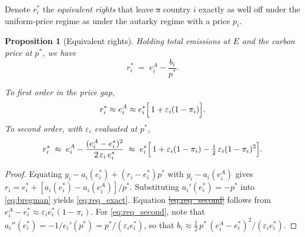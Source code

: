 \documentclass[12pt,english]{article}
\newtheorem{proposition}{Proposition}
\theoremstyle{remark}
\providecommand{\DIFaddtex}[1]{{\protect\color{blue}\uwave{#1}}} %
\providecommand{\DIFdeltex}[1]{{\protect\color{red}\sout{#1}}}                      %
\providecommand{\DIFaddbegin}{} %
\providecommand{\DIFaddend}{} %
\providecommand{\DIFdelbegin}{} %
\providecommand{\DIFdelend}{} %
\providecommand{\DIFadd}[1]{\texorpdfstring{\DIFaddtex{#1}}{#1}} %
\providecommand{\DIFdel}[1]{\texorpdfstring{\DIFdeltex{#1}}{}} %
\newcommand{\DIFscaledelfig}{0.5}
\newlength{\DIFdelgraphicswidth} %
\newlength{\DIFdelgraphicsheight} %
\newcommand{\DIFaddincludegraphics}[2][]{{\color{blue}\fbox{\DIFOincludegraphics[#1]{#2}}}} %
\newcommand{\DIFdelincludegraphics}[2][]{%
\sbox{\DIFdelgraphicsbox}{\DIFOincludegraphics[#1]{#2}}%
\settoboxwidth{\DIFdelgraphicswidth}{\DIFdelgraphicsbox} %
\settoboxtotalheight{\DIFdelgraphicsheight}{\DIFdelgraphicsbox} %
\scalebox{\DIFscaledelfig}{%
\parbox[b]{\DIFdelgraphicswidth}{\usebox{\DIFdelgraphicsbox}\\[-\baselineskip] \rule{\DIFdelgraphicswidth}{0em}}\llap{\resizebox{\DIFdelgraphicswidth}{\DIFdelgraphicsheight}{%
\setlength{\unitlength}{\DIFdelgraphicswidth}%
\begin{picture}(1,1)%
\thicklines\linethickness{2pt} %
{\color[rgb]{1,0,0}\put(0,0){\framebox(1,1){}}}%
{\color[rgb]{1,0,0}\put(0,0){\line( 1,1){1}}}%
{\color[rgb]{1,0,0}\put(0,1){\line(1,-1){1}}}%
\end{picture}%
}\hspace*{3pt}}} %
} %
\DeclareRobustCommand{\DIFaddbegin}{\DIFOaddbegin \let\includegraphics\DIFaddincludegraphics} %
\DeclareRobustCommand{\DIFaddend}{\DIFOaddend \let\includegraphics\DIFOincludegraphics} %
\DeclareRobustCommand{\DIFdelbegin}{\DIFOdelbegin \let\includegraphics\DIFdelincludegraphics} %
\DeclareRobustCommand{\DIFdelend}{\DIFOaddend \let\includegraphics\DIFOincludegraphics} %
\begin{document}
Denote \DIFaddbegin \DIFadd{by }\DIFaddend $r^*_i$ the \textit{equivalent rights} that leave \DIFdelbegin \DIFdel{a }\DIFdelend country $i$ exactly as well off under the uniform-price regime as under the autarky regime with a price $p_i$. 
\begin{proposition}[Equivalent rights]\label{prop:equiv}
Holding total emissions at $E$ and the carbon price at $p^*$, we have
\begin{equation}
  r^*_i \;=\; e^A_i - \frac{b_i}{p^*}. 
  \label{eq:req_exact}
\end{equation}

To first order in the price gap, 
\begin{equation}
  r^*_i \approx e^A_i \approx e^*_i\Bigl[\,1+\varepsilon_i(1-\pi_i)\Bigr].
    \label{eq:req_first}
\end{equation}
To second order, with $\varepsilon_i$ evaluated at $p^*$,
\begin{equation}
  r^*_i \;\approx\; e^A_i - \frac{(e^A_i-e^*_i)^2}{2\,\varepsilon_i\,e^*_i}
  \;\approx\; e^*_i\Bigl[\,1+\varepsilon_i(1-\pi_i)-\tfrac12\,\varepsilon_i(1-\pi_i)^2\Bigr].
  \label{eq:req_second}
\end{equation}
\end{proposition}

\begin{proof}
Equating $y_i-a_i(e^*_i)+(r_i-e^*_i)p^*$ with $y_i-a_i(e^A_i)$ gives $r_i=e^*_i+[a_i(e^*_i)-a_i(e^A_i)]/p^*$. Substituting $a_i'(e^*_i)=-p^*$ into \eqref{eq:bregman} yields \eqref{eq:req_exact}. Equation \DIFdelbegin \DIFdel{\eqref{eq:req_second} }\DIFdelend \DIFaddbegin \DIFadd{\eqref{eq:req_first} }\DIFaddend follows from $e^A_i-e^*_i\approx\varepsilon_i e^*_i(1-\pi_i)$. For \eqref{eq:req_second}, note that $a_i''(e^*_i)=-1/e_i'(p^*)=p^*/(\varepsilon_i e^*_i)$, so that $b_i\approx \tfrac12\,p^*\,(e^A_i-e^*_i)^2/(\varepsilon_i e^*_i)$. 
\end{proof}
\end{document}
